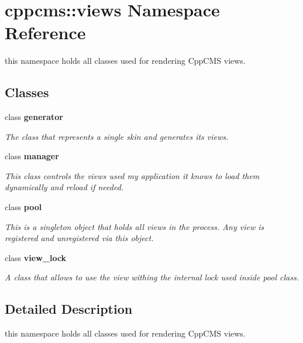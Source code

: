 \section{cppcms\+:\+:views Namespace Reference}
\label{namespacecppcms_1_1views}


this namespace holds all classes used for rendering Cpp\+C\+MS views.  


\subsection*{Classes}
\begin{DoxyCompactItemize}
\item 
class {\bf generator}
\begin{DoxyCompactList}\small\item\em The class that represents a single skin and generates its views. \end{DoxyCompactList}\item 
class {\bf manager}
\begin{DoxyCompactList}\small\item\em This class controls the views used my application it knows to load them dynamically and reload if needed. \end{DoxyCompactList}\item 
class {\bf pool}
\begin{DoxyCompactList}\small\item\em This is a singleton object that holds all views in the process. Any view is registered and unregistered via this object. \end{DoxyCompactList}\item 
class {\bf view\+\_\+lock}
\begin{DoxyCompactList}\small\item\em A class that allows to use the view withing the internal lock used inside pool class. \end{DoxyCompactList}\end{DoxyCompactItemize}


\subsection{Detailed Description}
this namespace holds all classes used for rendering Cpp\+C\+MS views. 